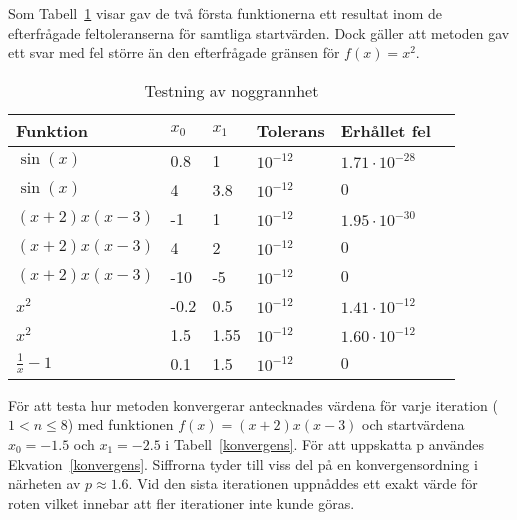 \documentclass[12pt]{article}
\begin{document}
Som Tabell~\ref{noggrannhet} visar gav de två första funktionerna ett resultat inom de efterfrågade feltoleranserna för samtliga startvärden. Dock gäller att metoden gav ett svar med fel större än den efterfrågade gränsen för $f(x) = x^2$.
\begin{table}[H]
  \centering
  \begin{tabu}{ l l l l l l }
    Funktion & $x_0$ & $x_1$ & Tolerans & Erhållet fel \\
    \toprule
    $\sin(x)$          & 0.8  & 1   & $10^{-12}$ & $1.71\cdot 10^{-28}$ \\
    $\sin(x)$          & 4    & 3.8 & $10^{-12}$ & $0$\\
    $ (x+2) x (x-3)$   & -1   & 1   & $10^{-12}$  & $1.95\cdot 10^{-30}$ \\
    $ (x+2) x (x-3)$   & 4    & 2   & $10^{-12}$  & $0$ \\
    $ (x+2) x (x-3)$   & -10  & -5 & $10^{-12}$   & $0$ \\
    $ x^{2}$           & -0.2 & 0.5 & $10^{-12}$  & $1.41\cdot 10^{-12} $ \\
    $ x^{2}$           & 1.5 & 1.55 & $10^{-12}$  & $1.60\cdot 10^{-12} $ \\
    $\frac{1}{x} - 1 $ & 0.1  & 1.5 & $10^{-12}$  & $0$ \\
  \end{tabu}
  \caption{Testning av noggrannhet}\label{noggrannhet}
\end{table}

För att testa hur metoden konvergerar antecknades värdena för varje iteration ($1 < n \leq 8$) med funktionen $f(x)=(x+2) x (x-3)$ och startvärdena $x_0=-1.5$ och $x_1=-2.5$ i Tabell~\ref{konvergens}. För att uppskatta p användes Ekvation~\ref{konvergens}. Siffrorna tyder till viss del på en konvergensordning i närheten av $p\approx 1.6$. Vid den sista iterationen uppnåddes ett exakt värde för roten vilket innebar att fler iterationer inte kunde göras.
\end{document}
